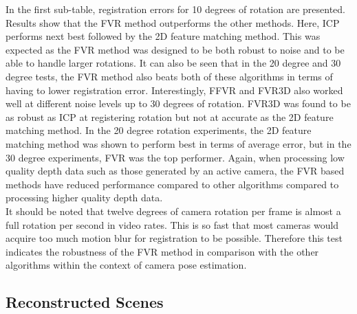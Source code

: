 In the first sub-table, registration errors for 10 degrees of rotation are presented. Results show that the FVR method outperforms the other methods. Here, ICP performs next best followed by the 2D feature matching method. This was expected as the FVR method was designed to be both robust to noise and to be able to handle larger rotations. It can also be seen that in the 20 degree and 30 degree tests, the FVR method also beats both of these algorithms in terms of having to lower registration error. Interestingly, FFVR and FVR3D also worked well at different noise levels up to 30 degrees of rotation. FVR3D was found to be as robust as ICP at registering rotation but not at accurate as the 2D feature matching method. In the 20 degree rotation experiments, the 2D feature matching method was shown to perform best in terms of average error, but in the 30 degree experiments, FVR was the top performer. Again, when processing low quality depth data such as those generated by an active camera, the FVR based methods have reduced performance compared to other algorithms compared to processing higher quality depth data. \\ 

It should be noted that twelve degrees of camera rotation per frame is almost a full rotation per second in video rates. This is so fast that most cameras would acquire too much motion blur for registration to be possible. Therefore this test indicates the robustness of the FVR method in comparison with the other algorithms within the context of camera pose estimation. \\


\subsection{Reconstructed Scenes}
\label{Sec:FVRQual1Exp}

